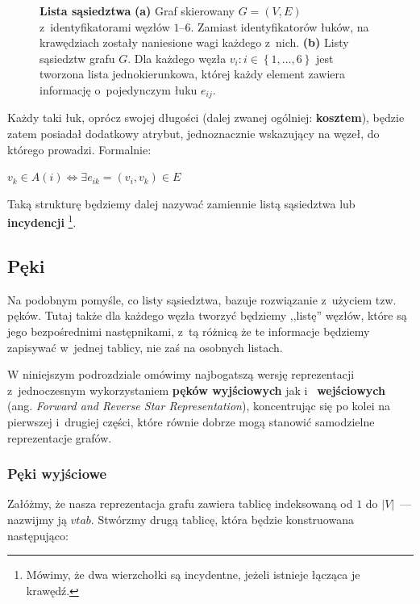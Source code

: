 \begin{figure}[!htbp]
\begin{subfigure}[b]{0.33\textwidth}
		\caption{}
	\end{subfigure}
	\caption{\textbf{Lista sąsiedztwa} \textbf{(a)} Graf skierowany $G = \left( V, E \right)$ z~identyfikatorami węzłów $1$--$6$. Zamiast identyfikatorów łuków, na krawędziach zostały naniesione wagi każdego z~nich. \textbf{(b)} Listy sąsiedztw grafu $G$. Dla każdego węzła $v_{i} : i \in \left\{ 1, \ldots, 6 \right\}$ jest tworzona lista jednokierunkowa, której każdy element zawiera informację o~pojedynczym łuku $e_{ij}$.}\label{fig:adjacencyList}
\end{figure}

Każdy taki łuk, oprócz swojej długości (dalej zwanej ogólniej: \textbf{kosztem}), będzie zatem posiadał dodatkowy atrybut, jednoznacznie wskazujący na węzeł, do którego prowadzi. Formalnie:

$v_{k} \in A \left ( i \right ) \Leftrightarrow \exists e_{ik} = \left( v_{i}, v_{k} \right) \in E $

Taką strukturę będziemy dalej nazywać zamiennie listą sąsiedztwa lub \textbf{incydencji} \footnote{Mówimy, że dwa wierzchołki są incydentne, jeżeli istnieje łącząca je krawędź.}.

\subsection{Pęki}

Na podobnym pomyśle, co listy sąsiedztwa, bazuje rozwiązanie z~użyciem tzw. pęków. Tutaj także dla każdego węzła tworzyć będziemy ,,listę'' węzłów, które są jego bezpośrednimi następnikami, z~tą różnicą że te informacje będziemy zapisywać w~jednej tablicy, nie zaś na osobnych listach.

W niniejszym podrozdziale omówimy najbogatszą wersję reprezentacji z~jednoczesnym wykorzystaniem \textbf{pęków wyjściowych} jak i~\textbf{ wejściowych} (ang. \textit{Forward and Reverse Star Representation}), koncentrując się po kolei na pierwszej i~drugiej części, które równie dobrze mogą stanowić samodzielne reprezentacje grafów.

\subsubsection{Pęki wyjściowe}

Załóżmy, że nasza reprezentacja grafu zawiera tablicę indeksowaną od $1$ do $ \left| V \right| $~---  nazwijmy ją $vtab$. Stwórzmy drugą tablicę, która będzie konstruowana następująco:

